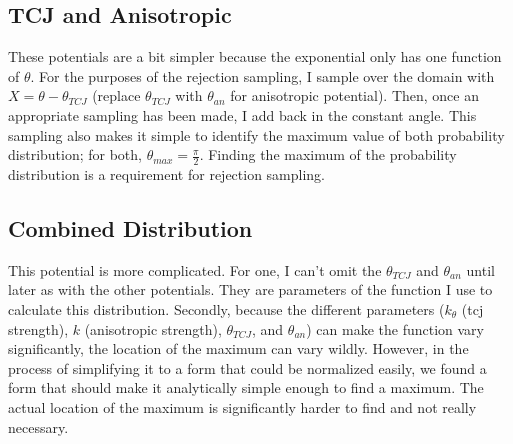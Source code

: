 \documentclass[12pt]{article}
\begin{document}
\subsection{TCJ and Anisotropic}
These potentials are a bit simpler because the exponential only has one function of $\theta$. For the purposes of the rejection sampling, I sample over the domain with $X = \theta - \theta_{TCJ}$ (replace $\theta_{TCJ}$ with $\theta_{an}$ for anisotropic potential). Then, once an appropriate sampling has been made, I add back in the constant angle. This sampling also makes it simple to identify the maximum value of both probability distribution; for both, $\theta_{max} = \frac{\pi}{2}$. Finding the maximum of the probability distribution is a requirement for rejection sampling.

\subsection{Combined Distribution}
This potential is more complicated. For one, I can't omit the $\theta_{TCJ}$ and $\theta_{an}$ until later as with the other potentials. They are parameters of the function I use to calculate this distribution. Secondly, because the different parameters ($k_\theta$ (tcj strength), $k$ (anisotropic strength), $\theta_{TCJ}$, and $\theta_{an}$) can make the function vary significantly, the location of the maximum can vary wildly. However, in the process of simplifying it to a form that could be normalized easily, we found a form that should make it analytically simple enough to find a maximum. The actual location of the maximum is significantly harder to find and not really necessary. 
\end{document}
